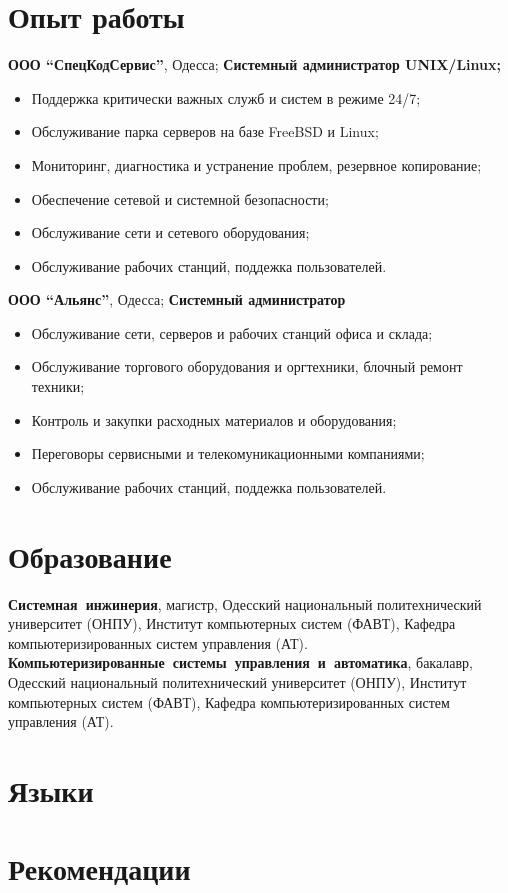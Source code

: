 \documentclass[10pt,a4paper,serif]{moderncv}
\begin{document}
	\section{Опыт работы}
			{\textbf{ООО ``СпецКодСервис''}, Одесса;
			\newline\textbf{Системный администратор	UNIX/Linux;}
			\begin{itemize}
				\item Поддержка критически важных служб и систем в режиме 24/7;
			    \item Обслуживание парка серверов на базе FreeBSD и Linux;
			    \item Мониторинг, диагностика и устранение проблем, резервное
			    копирование;
			    \item Обеспечение сетевой и системной безопасности;
			    \item Обслуживание сети и сетевого оборудования;
			    \item Обслуживание рабочих станций, поддежка пользователей.
			\end{itemize}}
			{\textbf{ООО ``Альянс''}, Одесса;
			\newline\textbf{Системный администратор}
			\begin{itemize}
			    \item Обслуживание сети, серверов и рабочих станций офиса
			    и склада;
			    \item Обслуживание торгового оборудования и оргтехники, блочный ремонт
			    техники;
			    \item Контроль и закупки расходных материалов и оборудования;
			    \item Переговоры сервисными и телекомуникационными компаниями;
			    \item Обслуживание рабочих станций, поддежка пользователей.
			\end{itemize}}

	\newpage
	\section{Образование}
			{\textbf{\mbox{Системная инжинерия}}, магистр,
			\newline Одесский национальный политехнический университет (ОНПУ),
			\newline Институт компьютерных систем (ФАВТ),
			\newline Кафедра компьютеризированных систем управления (АТ).}
			{\textbf{\mbox{Компьютеризированные системы управления и автоматика}},
				бакалавр,
			\newline Одесский национальный политехнический университет (ОНПУ),
			\newline Институт компьютерных систем (ФАВТ),
			\newline Кафедра компьютеризированных систем управления (АТ).}
		
	\section{Языки}
	
	\section{Рекомендации}
\end{document}
